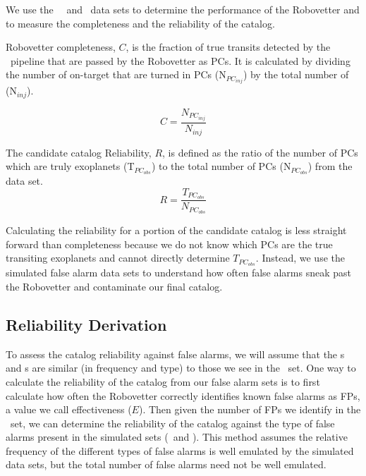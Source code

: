 %

\newcommand{\opsfp}{N$_{FP_{obs}}$}
\newcommand{\opspc}{N$_{PC_{obs}}$}
\newcommand{\opsN}{N$_{obs}$}
\newcommand{\trueopspc}{T$_{PC_{obs}}$}
\newcommand{\missedfp}{T$_{FP_{obs}}$ - N$_{FP_{obs}}$}
\newcommand{\invfp}{N$_{FP_{inv}}$}
\newcommand{\invpc}{N$_{PC_{inv}}$}
\newcommand{\invN}{N$_{inv}$}
\newcommand{\sfatce}{SFA-TCE}


We use the \injtce\, \scrtce\ and \invtce\ data sets to determine the performance of the Robovetter and to measure the completeness and the reliability of the catalog. 

Robovetter completeness, $C$, is the fraction of true transits detected by the \Kepler\ pipeline that are passed by the Robovetter as PCs.  It is calculated by dividing the number of on-target  that are turned in PCs (N$_{PC_{inj}}$) by the total number of  (N$_{inj}$).

\begin{equation}
\label{comp}
C = \frac{N_{PC_{inj}}}{N_{inj}}
\end{equation}

The candidate catalog Reliability, $R$, is defined as the ratio of the number of PCs which are truly exoplanets (\trueopspc) to the total number of PCs (\opspc) from the \opstce{} data set. 
\begin{equation}
\label{eq:rel}
R = \frac{T_{PC_{obs}}}{N_{PC_{obs}}}
\end{equation}

Calculating the reliability for a portion of the candidate catalog is less straight forward than completeness because we do not know which PCs are the true transiting exoplanets and cannot directly determine $T_{PC_{obs}}$. Instead, we use the simulated false alarm data sets to understand how often false alarms sneak past the Robovetter and contaminate our final catalog.


\subsection{Reliability Derivation}
\label{s:relcalc}
To assess the catalog reliability against false alarms, we will assume that the \scrtce s and \invtce s are similar (in frequency and type) to those we see in the \opstce\ set.  One way to calculate the reliability of the catalog from our false alarm sets is to first calculate how often the Robovetter correctly identifies known false alarms as FPs, a value we call effectiveness ($E$).  Then given the number of FPs we identify in the \opstce\ set, we can determine the reliability of the catalog against the type of false alarms present in the simulated sets (\invtce\ and \scrtce). This method assumes the relative frequency of the different types of false alarms is well emulated by the simulated data sets, but the total number of false alarms need not be well emulated.


